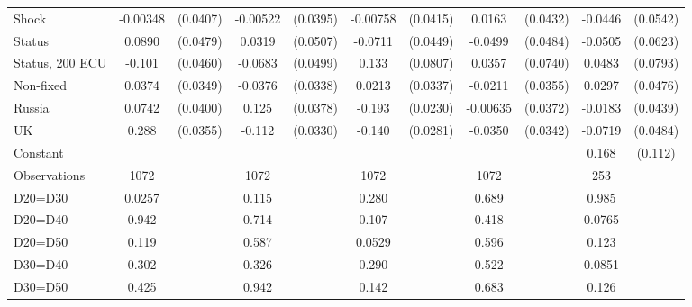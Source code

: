 \begin{tabular}{l|cccccccc|cc}
Shock         & -0.00348         & (0.0407)& -0.00522         & (0.0395)& -0.00758         & (0.0415)&   0.0163         & (0.0432)&  -0.0446         & (0.0542)\\
Status        &   0.0890\sym{*}  & (0.0479)&   0.0319         & (0.0507)&  -0.0711         & (0.0449)&  -0.0499         & (0.0484)&  -0.0505         & (0.0623)\\
Status, 200 ECU&   -0.101\sym{**} & (0.0460)&  -0.0683         & (0.0499)&    0.133\sym{*}  & (0.0807)&   0.0357         & (0.0740)&   0.0483         & (0.0793)\\
Non-fixed     &   0.0374         & (0.0349)&  -0.0376         & (0.0338)&   0.0213         & (0.0337)&  -0.0211         & (0.0355)&   0.0297         & (0.0476)\\
Russia        &   0.0742\sym{*}  & (0.0400)&    0.125\sym{***}& (0.0378)&   -0.193\sym{***}& (0.0230)& -0.00635         & (0.0372)&  -0.0183         & (0.0439)\\
UK            &    0.288\sym{***}& (0.0355)&   -0.112\sym{***}& (0.0330)&   -0.140\sym{***}& (0.0281)&  -0.0350         & (0.0342)&  -0.0719         & (0.0484)\\
Constant        &                  &         &                  &         &                  &         &                  &         &    0.168         &  (0.112)\\
\hline
Observations    &     1072         &         &     1072         &         &     1072         &         &     1072         &         &      253         &         \\
D20=D30         &   0.0257         &         &    0.115         &         &    0.280         &         &    0.689         &         &    0.985         &         \\
D20=D40         &    0.942         &         &    0.714         &         &    0.107         &         &    0.418         &         &   0.0765         &         \\
D20=D50         &    0.119         &         &    0.587         &         &   0.0529         &         &    0.596         &         &    0.123         &         \\
D30=D40         &    0.302         &         &    0.326         &         &    0.290         &         &    0.522         &         &   0.0851         &         \\
D30=D50         &    0.425         &         &    0.942         &         &    0.142         &         &    0.683         &         &    0.126         &         \\

\end{tabular}
